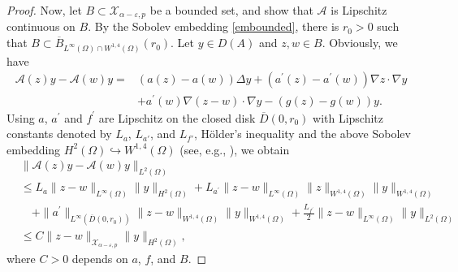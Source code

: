\documentclass[reqno]{amsart}
\numberwithin{equation}{section}
\begin{document}
\begin{proof}
Now, let $B\subset \mathcal{X}_{\alpha-\varepsilon,p}$ be a bounded set, and show that $\mathcal{A}$ is Lipschitz continuous on $B$. By the Sobolev embedding \eqref{embounded}, there is $r_0>0$ such that $B\subset \overline{B}_{L^{\infty}(\Omega)\cap W^{1,4}(\Omega)}(r_0)$.
Let $y\in D(A)$ and $z, w\in B$. Obviously, we have
\begin{align*}
	\mathcal{A}(z)y-\mathcal{A}(w)y=&(a(z)-a(w))\Delta y + (a^{\prime}(z)-a^{\prime}(w))\nabla z\cdot\nabla y \\
    &+a^{\prime}(w)\nabla(z-w)\cdot\nabla y-(g(z)-g(w))y.
\end{align*}
Using $a$, $a^{\prime}$ and $f^\prime$ are Lipschitz on the closed disk $\overline{D}(0,r_0)$ with Lipschitz constants denoted by $L_a$, $L_{a'}$, and $L_{f'}$, Hölder's inequality and the above Sobolev embedding $H^{2}(\Omega)\hookrightarrow W^{1,4}(\Omega)$ (see, e.g., \cite[Theorem 4.12]{AF03}), we obtain
			\begin{align*}
				&\|\mathcal{A}(z)y-\mathcal{A}(w)y\|_{L^{2}(\Omega)}\\
				&\leq L_a\|z-w\|_{L^{\infty}(\Omega)}\|y\|_{H^2(\Omega)} +L_{a^\prime} \|z-w\|_{L^{\infty}(\Omega)}\| z\|_{W^{1,4}(\Omega)}\|y\|_{W^{1,4}(\Omega)} \\
				& \quad +\|a^\prime\|_{L^\infty(\overline{D}(0,r_0))}\|z-w\|_{W^{1,4}(\Omega)}\| y\|_{W^{1,4}(\Omega)} + \frac{L_{f^\prime}}{2}\|z-w\|_{L^{\infty}(\Omega)}\|y\|_{L^{2}(\Omega)}\\
				&\leq C\|z-w\|_{\mathcal{X}_{\alpha-\varepsilon,p}}\|y\|_{H^{2}(\Omega)},
			\end{align*}
            where $C>0$ depends on $a$, $f$, and $B$.
\end{proof}

\end{document}
